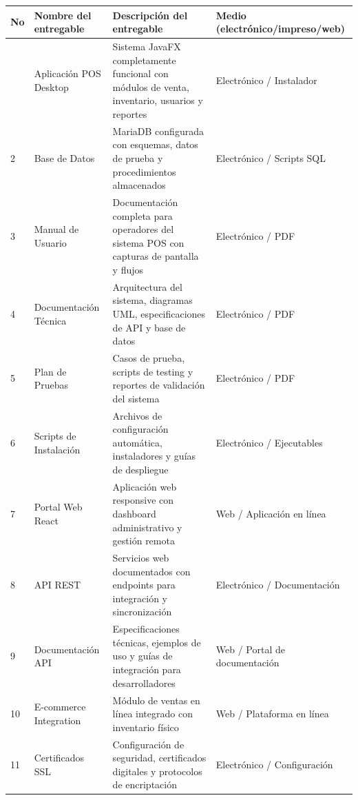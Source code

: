 \documentclass[12pt,letterpaper]{article}
\begin{document}
\begin{longtable}{|>{\centering}p{1cm}|p{6cm}|p{8cm}|>{\centering\arraybackslash}p{3cm}|}
\hline
\rowcolor{cobrablue!20}
\textbf{No} & \textbf{Nombre del entregable} & \textbf{Descripción del entregable} & \textbf{Medio (electrónico/impreso/web)} \\
\hline
\endhead

1 & Aplicación POS Desktop & Sistema JavaFX completamente funcional con módulos de venta, inventario, usuarios y reportes & Electrónico / Instalador \\
\hline

2 & Base de Datos & MariaDB configurada con esquemas, datos de prueba y procedimientos almacenados & Electrónico / Scripts SQL \\
\hline

3 & Manual de Usuario & Documentación completa para operadores del sistema POS con capturas de pantalla y flujos & Electrónico / PDF \\
\hline

4 & Documentación Técnica & Arquitectura del sistema, diagramas UML, especificaciones de API y base de datos & Electrónico / PDF \\
\hline

5 & Plan de Pruebas & Casos de prueba, scripts de testing y reportes de validación del sistema & Electrónico / PDF \\
\hline

6 & Scripts de Instalación & Archivos de configuración automática, instaladores y guías de despliegue & Electrónico / Ejecutables \\
\hline

7 & Portal Web React & Aplicación web responsive con dashboard administrativo y gestión remota & Web / Aplicación en línea \\
\hline

8 & API REST & Servicios web documentados con endpoints para integración y sincronización & Electrónico / Documentación \\
\hline

9 & Documentación API & Especificaciones técnicas, ejemplos de uso y guías de integración para desarrolladores & Web / Portal de documentación \\
\hline

10 & E-commerce Integration & Módulo de ventas en línea integrado con inventario físico & Web / Plataforma en línea \\
\hline

11 & Certificados SSL & Configuración de seguridad, certificados digitales y protocolos de encriptación & Electrónico / Configuración \\
\hline


\end{longtable}
\end{document}

